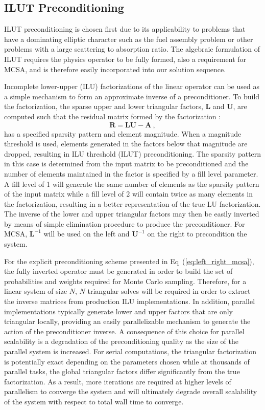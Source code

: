 \subsection{ILUT Preconditioning}
\label{subsec:spn_ilut_preconditioning}
ILUT preconditioning is chosen first due to its applicability to
problems that have a dominating elliptic character such as the fuel
assembly problem or other problems with a large scattering to
absorption ratio. The algebraic formulation of ILUT requires the
physics operator to be fully formed, also a requirement for MCSA, and
is therefore easily incorporated into our solution sequence.

Incomplete lower-upper (ILU) factorizations of the linear operator can
be used as a simple mechanism to form an approximate inverse of a
preconditioner. To build the factorization, the sparse upper and lower
triangular factors, $\mathbf{L}$ and $\mathbf{U}$, are computed such
that the residual matrix formed by the factorization
\cite{saad_iterative_2003}:
\begin{equation}
  \mathbf{R} = \mathbf{L} \mathbf{U} - \mathbf{A} \:,
  \label{eq:ilu_residual_matrix}
\end{equation}
has a specified sparsity pattern and element magnitude. When a
magnitude threshold is used, elements generated in the factors below
that magnitude are dropped, resulting in ILU threshold (ILUT)
preconditioning. The sparsity pattern in this case is determined from
the input matrix to be preconditioned and the number of elements
maintained in the factor is specified by a fill level parameter. A
fill level of 1 will generate the same number of elements as the
sparsity pattern of the input matrix while a fill level of 2 will
contain twice as many elements in the factorization, resulting in a
better representation of the true LU factorization. The inverse of the
lower and upper triangular factors may then be easily inverted by
means of simple elimination procedure to produce the
preconditioner. For MCSA, $\mathbf{L}^{-1}$ will be used on the left
and $\mathbf{U}^{-1}$ on the right to precondition the system.

For the explicit preconditioning scheme presented in
Eq~(\ref{eq:left_right_mcsa}), the fully inverted operator must be
generated in order to build the set of probabilities and weights
required for Monte Carlo sampling. Therefore, for a linear system of
size $N$, $N$ triangular solves will be required in order to extract
the inverse matrices from production ILU implementations. In addition,
parallel implementations typically generate lower and upper factors
that are only triangular locally, providing an easily parallelizable
mechanism to generate the action of the preconditioner inverse. A
consequence of this choice for parallel scalability is a degradation
of the preconditioning quality as the size of the parallel system is
increased. For serial computations, the triangular factorization is
potentially exact depending on the parameters chosen while at
thousands of parallel tasks, the global triangular factors differ
significantly from the true factorization. As a result, more
iterations are required at higher levels of parallelism to converge
the system and will ultimately degrade overall scalability of the
system with respect to total wall time to converge.

